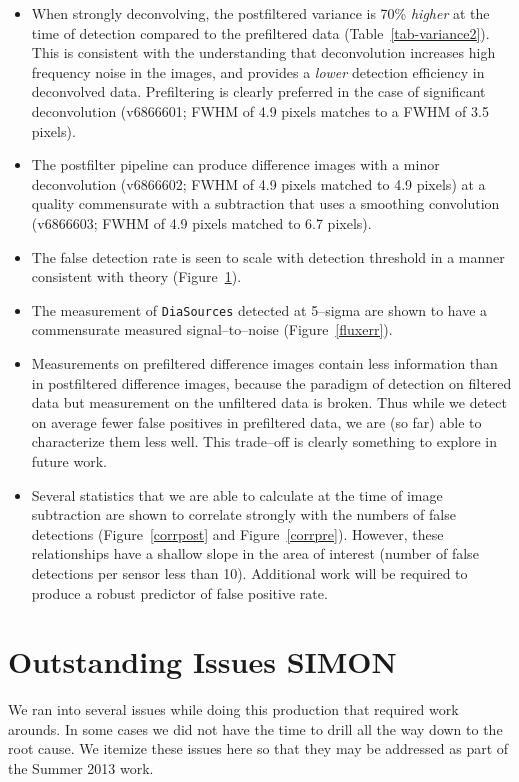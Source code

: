 \documentclass[prd, nofootinbib, floatfix, 11pt,tightenlines,times]{article}
\begin{document}
\begin{itemize}
\item When strongly deconvolving, the postfiltered variance is 70\%
  {\it higher} at the time of detection compared to the prefiltered
  data (Table~\ref{tab-variance2}).  This is consistent with the
  understanding that deconvolution increases high frequency noise in
  the images, and provides a {\it lower} detection efficiency in
  deconvolved data.  Prefiltering is clearly preferred in the case of
  significant deconvolution (v6866601; FWHM of 4.9 pixels matches to a
  FWHM of 3.5 pixels).

\item The postfilter pipeline can produce difference images with a
  minor deconvolution (v6866602; FWHM of 4.9 pixels matched to 4.9
  pixels) at a quality commensurate with a subtraction that uses a
  smoothing convolution (v6866603; FWHM of 4.9 pixels matched to 6.7
  pixels).

\item The false detection rate is seen to scale with detection
  threshold in a manner consistent with theory (Figure~\ref{}).

\item The measurement of {\tt DiaSources} detected at 5--sigma are
  shown to have a commensurate measured signal--to--noise
  (Figure~\ref{fluxerr}).  

\item Measurements on prefiltered difference images contain less
  information than in postfiltered difference images, because the
  paradigm of detection on filtered data but measurement on the
  unfiltered data is broken.  Thus while we detect on average fewer
  false positives in prefiltered data, we are (so far) able to
  characterize them less well.  This trade--off is clearly something
  to explore in future work.

\item Several statistics that we are able to calculate at the time of
  image subtraction are shown to correlate strongly with the numbers
  of false detections (Figure~\ref{corrpost} and
  Figure~\ref{corrpre}).  However, these relationships have a shallow
  slope in the area of interest (number of false detections per sensor
  less than 10).  Additional work will be required to produce a robust
  predictor of false positive rate.


\end{itemize}

\section{Outstanding Issues {\bf SIMON}}
We ran into several issues while doing this production that required work 
arounds.  In some cases we did not have the time to drill all the way down
to the root cause.  We itemize these issues here so that they may be addressed 
as part of the Summer 2013 work.
\end{document}
